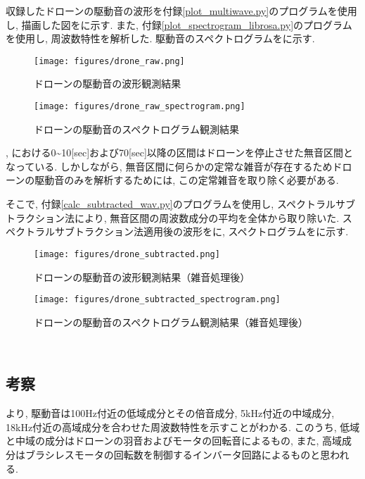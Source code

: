 収録したドローンの駆動音の波形を付録\ref{plot_multiwave.py}のプログラムを使用し, 描画した図をに示す. また, 付録\ref{plot_spectrogram_librosa.py}のプログラムを使用し, 周波数特性を解析した. 駆動音のスペクトログラムをに示す. 

\begin{figure}[H]
\centering
\texttt{[image: figures/drone\_raw.png]}
\caption{ドローンの駆動音の波形観測結果}
\label{fig:drone_raw}
\end{figure}

\begin{figure}[H]
\centering
\texttt{[image: figures/drone\_raw\_spectrogram.png]}
\caption{ドローンの駆動音のスペクトログラム観測結果}
\label{fig:drone_raw_spectrogram}
\end{figure}

, における0\textasciitilde10[sec]および70[sec]以降の区間はドローンを停止させた無音区間となっている. しかしながら, 無音区間に何らかの定常な雑音が存在するためドローンの駆動音のみを解析するためには, この定常雑音を取り除く必要がある. 

そこで, 付録\ref{calc_subtracted_wav.py}のプログラムを使用し, スペクトラルサブトラクション法\cite{spectral_subtraction}により, 無音区間の周波数成分の平均を全体から取り除いた. 
スペクトラルサブトラクション法適用後の波形をに, スペクトログラムをに示す. 

\begin{figure}[H]
\centering
\texttt{[image: figures/drone\_subtracted.png]}
\caption{ドローンの駆動音の波形観測結果（雑音処理後）}
\label{fig:drone_subtracted}
\end{figure}

\begin{figure}[H]
\centering
\texttt{[image: figures/drone\_subtracted\_spectrogram.png]}
\caption{ドローンの駆動音のスペクトログラム観測結果（雑音処理後）}
\label{fig:drone_subtracted_spectrogram}
\end{figure}


\
\subsection{考察}\label{consideration-drone}

より, 駆動音は100Hz付近の低域成分とその倍音成分, 5kHz付近の中域成分, 18kHz付近の高域成分を合わせた周波数特性を示すことがわかる. このうち, 低域と中域の成分はドローンの羽音およびモータの回転音によるもの, また, 高域成分はブラシレスモータの回転数を制御するインバータ回路によるものと思われる. 

